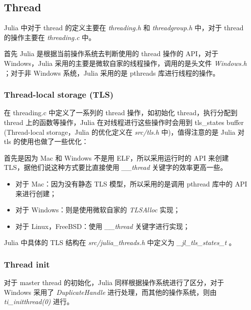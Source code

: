 \subsection{Thread}
Julia 中对于 thread 的定义主要在 \emph{threading.h} 和 \emph{threadgroup.h} 中，对于 thread 的操作主要在 \emph{threading.c} 中。

首先 Julia 是根据当前操作系统去判断使用的 thread 操作的 API，对于 Windows，Julia 采用的主要是微软自家的线程操作，调用的是头文件 \emph{Windows.h} ；对于非 Windows 系统，Julia 采用的是 pthreads 库进行线程的操作。

\subsubsection{Thread-local storage (TLS)}

在 threading.c 中定义了一系列的 thread 操作，如初始化 thread，执行分配到 thread 上的函数等操作，Julia 在对线程进行这些操作时会用到 tls\_states buffer (Thread-local storage，Julia 的优化定义在 \emph{src/tls.h} 中)，值得注意的是 Julia 对 tls 的使用也做了一些优化：

首先是因为 Mac 和 Windows 不是用 ELF，所以采用运行时的 API 来创建 TLS，据他们说这种方式要比直接使用 \emph{\_\_thread} 关键字的效率更高一些。

\begin{itemize}
    \item 对于 Mac：因为没有静态 TLS 模型，所以采用的是调用 pthread 库中的 API 来进行创建；
    \item 对于 Windows：则是使用微软自家的 \emph{TLSAlloc} 实现；
    \item 对于 Linux，FreeBSD：使用 \emph{\_\_thread} 关键字进行实现；
\end{itemize}

Julia 中具体的 TLS 结构在 \emph{src/julia\_threads.h} 中定义为 \emph{\_jl\_tls\_states\_t} 。

\subsubsection{Thread init}

对于 master thread 的初始化，Julia 同样根据操作系统进行了区分，对于 Windows 采用了 \emph{DuplicateHandle} 进行处理，而其他的操作系统，则由 \emph{ti\_initthread(0)} 进行。


